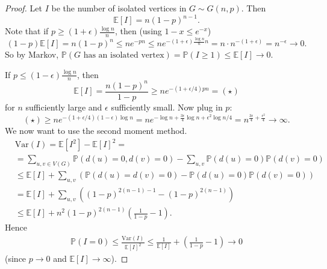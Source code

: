\documentclass{article}
\theoremstyle{definition}
\begin{document}
\begin{proof}
    Let $I$ be the number of isolated vertices in $G \sim G(n,p)$. Then \[
    \mathbb{E}[I]=n(1-p)^{n-1}.
    \]
    Note that if $p \ge (1+\epsilon)\frac{\log n}{n}$, then (using $1-x \le e^{-x}$) \[
        (1-p)\mathbb{E}[I] = n(1-p)^n \le ne^{-pn} \le ne^{-(1+\epsilon)\frac{\log n}{n}n} = n \cdot n^{-(1+\epsilon)} = n^{-\epsilon} \to 0.
    \]
    So by Markov, $\mathbb{P}(G \text{ has an isolated vertex})= \mathbb{P}(I \ge 1) \le \mathbb{E}[I] \to 0$.
    \vspace{1mm}
    
    If $p\le (1-\epsilon)\frac{\log n}{n}$, then \[
    \mathbb{E}[I]=\frac{n(1-p)^{n}}{1-p} \ge ne^{-(1+\epsilon/4)pn} = (\star)
    \]
    for $n$ sufficiently large and $\epsilon$ sufficiently small. Now plug in $p$:
    \[
    (\star) \ge n e^{-(1+\epsilon/4)(1-\epsilon)\log n} = n e^{-\log n + \frac{3\epsilon}{4}\log n + \epsilon^2 \log n/4} = n^{\frac{3\epsilon}{4} + \frac{\epsilon^2}{4}} \to \infty.
    \]
    We now want to use the second moment method. 
    \begin{align*}
        &\text{Var}(I)=\mathbb{E}[I^2]-\mathbb{E}[I]^2 = \\
        &=\sum_{u,v \in V(G)}^{} \mathbb{P}(d(u)=0, d(v)=0) - \sum_{u,v}^{}  \mathbb{P}(d(u)=0)\mathbb{P}(d(v)=0) \\
        &\le \mathbb{E}[I] + \sum_{u,v}^{} \left(\mathbb{P}(d(u)=d(v)=0)-\mathbb{P}(d(u)=0)\mathbb{P}(d(v)=0)\right) \\
        &= \mathbb{E}[I] + \sum_{u,v}^{} \left((1-p)^{2(n-1)-1} - (1-p)^{2(n-1)}\right) \\
        &\le \mathbb{E}[I] + n^2(1-p)^{2(n-1)} \left(\frac{1}{1-p}-1\right).
    \end{align*}
    Hence
    \begin{align*}
        \mathbb{P}(I=0) \le \frac{\text{Var}(I)}{\mathbb{E}[I]^2} \le \frac{1}{\mathbb{E}[I]} + \left(\frac{1}{1-p}-1\right) \to 0
    \end{align*}
    (since $p \to 0$ and $\mathbb{E}[I]\to \infty$).
\end{proof}
\end{document}
